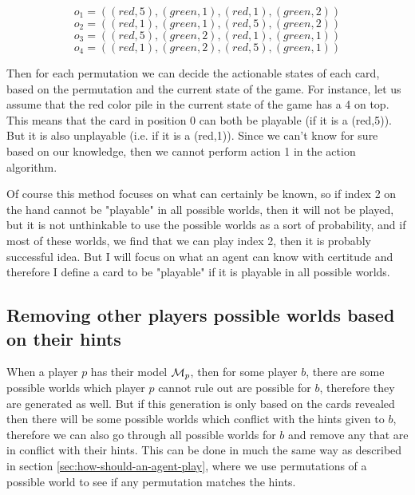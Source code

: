 \[o_{1} = ((red,5),(green,1),(red,1),(green,2))\]
\[o_{2} = ((red,1),(green,1),(red,5),(green,2))\]
\[o_{3} = ((red,5),(green,2),(red,1),(green,1))\]
\[o_{4} = ((red,1),(green,2),(red,5),(green,1))\]

Then for each permutation we can decide the actionable states of each card, based on the permutation and the current state of the game. For instance, let us assume that the red color pile in the current state of the game has a 4 on top. This means that the card in position 0 can both be playable (if it is a (red,5)). But it is also unplayable (i.e. if it is a (red,1)). Since we can't know for sure based on our knowledge, then we cannot perform action 1 in the action algorithm.

Of course this method focuses on what can certainly be known, so if index 2 on the hand cannot be "playable" in all possible worlds, then it will not be played, but it is not unthinkable to use the possible worlds as a sort of probability, and if most of these worlds, we find that we can play index 2, then it is probably successful idea. But I will focus on what an agent can know with certitude and therefore I define a card to be "playable" if it is playable in all possible worlds.

\subsection{Removing other players possible worlds based on their hints} \label{sec:design:removing-worlds-based-on-hints}
When a player $p$ has their model $\mathcal{M}_p$, then for some player $b$, there are some possible worlds which player $p$ cannot rule out are possible for $b$, therefore they are generated as well. But if this generation is only based on the cards revealed then there will be some possible worlds which conflict with the hints given to $b$, therefore we can also go through all possible worlds for $b$ and remove any that are in conflict with their hints. This can be done in much the same way as described in section \ref{sec:how-should-an-agent-play}, where we use permutations of a possible world to see if any permutation matches the hints.

